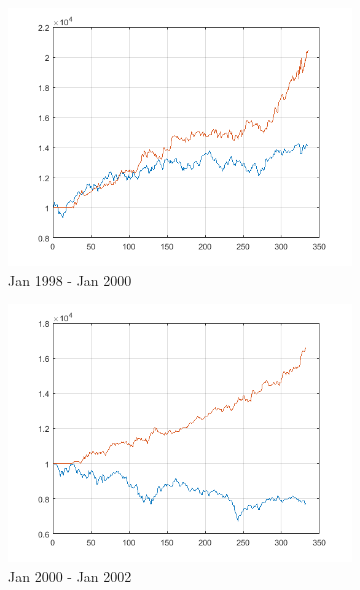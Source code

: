 \documentclass[11pt,a4,twosided,singlespacing,titlepagenumber=on]{scrreprt}
\numberwithin{equation}{chapter} %
\theoremstyle{remark}
\begin{document}
\begin{figure}[H]
\begin{subfigure}[t]{0.32\textwidth}
        \centering
        \includegraphics[width=1\textwidth]{res/backtest/5}
        \caption{Jan 1998 - Jan 2000}
    \end{subfigure}
    \begin{subfigure}[t]{0.32\textwidth}
        \centering
        \includegraphics[width=1\textwidth]{res/backtest_cpx/6}
        \caption{Jan 2000 - Jan 2002}
    \end{subfigure}
    \begin{subfigure}[t]{0.32\textwidth}
        \centering

\end{subfigure}
\end{figure}
\end{document}
